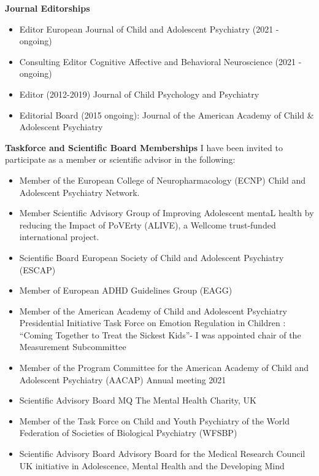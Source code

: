 \documentclass[
]{article}
\providecommand{\tightlist}{%
  \setlength{\itemsep}{0pt}\setlength{\parskip}{0pt}}
\begin{document}
\textbf{Journal Editorships}

\begin{itemize}
\tightlist
\item
  Editor European Journal of Child and Adolescent Psychiatry (2021 -
  ongoing)
\item
  Consulting Editor Cognitive Affective and Behavioral Neuroscience
  (2021 - ongoing)
\item
  Editor (2012-2019) Journal of Child Psychology and Psychiatry
\item
  Editorial Board (2015 ongoing): Journal of the American Academy of
  Child \& Adolescent Psychiatry
\end{itemize}

\textbf{Taskforce and Scientific Board Memberships} I have been invited
to participate as a member or scientific advisor in the following:

\begin{itemize}
\tightlist
\item
  Member of the European College of Neuropharmacology (ECNP) Child and
  Adolescent Psychiatry Network.
\item
  Member Scientific Advisory Group of Improving Adolescent mentaL health
  by reducing the Impact of PoVErty (ALIVE), a Wellcome trust-funded
  international project.
\item
  Scientific Board European Society of Child and Adolescent Psychiatry
  (ESCAP)
\item
  Member of European ADHD Guidelines Group (EAGG)
\item
  Member of the American Academy of Child and Adolescent Psychiatry
  Presidential Initiative Task Force on Emotion Regulation in Children :
  ``Coming Together to Treat the Sickest Kids''- I was appointed chair
  of the Measurement Subcommittee
\item
  Member of the Program Committee for the American Academy of Child and
  Adolescent Psychiatry (AACAP) Annual meeting 2021
\item
  Scientific Advisory Board MQ The Mental Health Charity, UK
\item
  Member of the Task Force on Child and Youth Psychiatry of the World
  Federation of Societies of Biological Psychiatry (WFSBP)
\item
  Scientific Advisory Board Advisory Board for the Medical Research
  Council UK initiative in Adolescence, Mental Health and the Developing
  Mind
\end{itemize}
\end{document}
